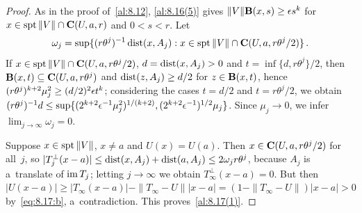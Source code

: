 \begin{proof}
    As in the proof of~\ref{al:8.12}, \ref{al:8.16(5)} gives $\|V\| \mathbf{B}(x,s) \ge \epsilon
    s^{k}$ for $x \in \operatorname{spt} \|V\| \cap \mathbf{C} ( U, a, r )$ and $0 < s < r$. Let
    \begin{displaymath}
        \omega_j = \sup \{ (r \theta^j)^{-1} \operatorname{dist}(x, A_j) : x \in \operatorname{spt} \|V\| \cap \mathbf{C} ( U, a, r
        \theta^j / 2 ) \} \,.
    \end{displaymath}
    If $x \in \operatorname{spt} \|V\| \cap \mathbf{C} ( U, a, r \theta^j/2 )$, $d = \operatorname{dist}(x, A_j) > 0$ and $t = \inf \{
    d, r \theta^j \}/2$, then $\mathbf{B}(x,t) \subseteq \mathbf{C} ( U, a, r \theta^j )$ and $\operatorname{dist}(z,
    A_j) \ge d/2$ for $z \in \mathbf{B}(x,t)$, hence $(r \theta^j)^{k+2} \mu_j^2 \ge (d/2)^2
    \epsilon t^{k}$; considering the cases $t = d/2$ and $t = r \theta^j/2$, we obtain $(r
    \theta^j)^{-1} d \le \sup \{ (2^{k+2} \epsilon^{-1} \mu_j^2)^{1/(k+2)}, (2^{k+2}
    \epsilon^{-1})^{1/2} \mu_j \}$. Since $\mu_j \to 0$, we infer $\lim_{j \to \infty} \omega_j =
    0$.

    Suppose $x \in \operatorname{spt} \|V\|$, $x \ne a$ and $U(x) = U(a)$. Then $x \in \mathbf{C} ( U, a, r
    \theta^j/2 )$ for all~$j$, so $|T_j^\perp(x - a)| \le \operatorname{dist}(x, A_j) + \operatorname{dist}(a, A_j) \le 2
    \omega_j r \theta^j$, because $A_j$ is a~translate of $\operatorname{im} T_j$; letting $j \to \infty$ we obtain
    $T_\infty^\perp(x - a) = 0$. But then $|U(x - a)| \ge |T_\infty(x - a)| - \|T_\infty - U\| |x -
    a| = (1 - \|T_\infty - U\|) |x - a| > 0$ by~\eqref{eq:8.17:b}, a~contradiction.
    This proves~\ref{al:8.17(1)}.


\end{proof}
